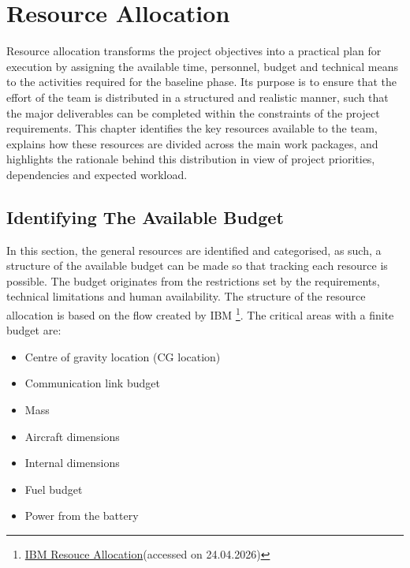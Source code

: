 \chapter{Resource Allocation}

Resource allocation transforms the project objectives into a practical plan for execution by assigning the available time, personnel, budget and technical means to the activities required for the baseline phase. Its purpose is to ensure that the effort of the team is distributed in a structured and realistic manner, such that the major deliverables can be completed within the constraints of the project requirements. This chapter identifies the key resources available to the team, explains how these resources are divided across the main work packages, and highlights the rationale behind this distribution in view of project priorities, dependencies and expected workload.

\section{Identifying The Available Budget}
In this section, the general resources are identified and categorised, as such, a structure of the available budget can be made so that tracking each resource is possible. The budget originates from the restrictions set by the requirements, technical limitations and human availability. The structure of the resource allocation is based on the flow created by IBM \footnote{\href{https://www.ibm.com/think/topics/resource-allocation}{IBM Resouce Allocation}(accessed on 24.04.2026)}.
The critical areas with a finite budget are:

\begin{itemize}
    \item Centre of gravity location (CG location)
    \item Communication link budget
    \item Mass
    \item Aircraft dimensions
    \item Internal dimensions
    \item Fuel budget
    \item Power from the battery
\end{itemize}



